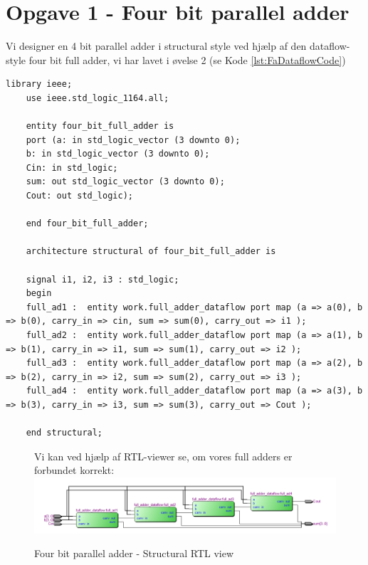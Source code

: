 \section{Opgave 1 - Four bit parallel adder}
\begin{enumerate}
	\item[1)]
Vi designer en 4 bit parallel adder i structural style ved hjælp af den dataflow-style four bit full adder, vi har lavet i øvelse 2 (se Kode \ref{lst:FaDataflowCode})


	\medskip
	\begin{lstlisting}[caption={Four bit parallel adder Structural VHDL kode},label={lst:4bitFaStructuralCode}]
	library ieee;
	use ieee.std_logic_1164.all;
	
	entity four_bit_full_adder is
	port (a: in std_logic_vector (3 downto 0);
	b: in std_logic_vector (3 downto 0);
	Cin: in std_logic;
	sum: out std_logic_vector (3 downto 0);
	Cout: out std_logic);
	
	end four_bit_full_adder;
	
	architecture structural of four_bit_full_adder is
	
	signal i1, i2, i3 : std_logic;
	begin
	full_ad1 : 	entity work.full_adder_dataflow port map (a => a(0), b => b(0), carry_in => cin, sum => sum(0), carry_out => i1 );
	full_ad2 : 	entity work.full_adder_dataflow port map (a => a(1), b => b(1), carry_in => i1, sum => sum(1), carry_out => i2 );
	full_ad3 : 	entity work.full_adder_dataflow port map (a => a(2), b => b(2), carry_in => i2, sum => sum(2), carry_out => i3 );
	full_ad4 : 	entity work.full_adder_dataflow port map (a => a(3), b => b(3), carry_in => i3, sum => sum(3), carry_out => Cout );
	
	end structural;
	\end{lstlisting}
	
\begin{figure}[H]
	\item[2)]
	Vi kan ved hjælp af RTL-viewer se, om vores full adders er forbundet korrekt:
	\centering
\includegraphics[scale=0.6]{pictures/Oevelse2/four_bit_full_adder_RTLview.jpeg}
\caption{Four bit parallel adder - Structural RTL view}
\label{fig:4bitFaBehavioralRTL}
\end{figure}


\end{enumerate}
